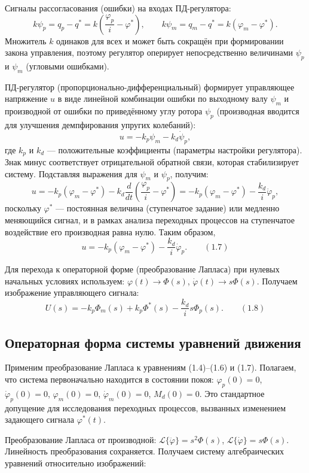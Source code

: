 \documentclass[a4paper, 14pt]{extarticle}
\begin{document}
    Сигналы рассогласования (ошибки) на входах ПД-регулятора:
    \[
    k\psi_p = q_p - q^* = k\left(\frac{\varphi_p}{i} - \varphi^*\right), \qquad
    k\psi_m = q_m - q^* = k\left(\varphi_m - \varphi^*\right).
    \]
    Множитель $k$ одинаков для всех и может быть сокращён при формировании закона управления, поэтому регулятор оперирует непосредственно величинами $\psi_p$ и $\psi_m$ (угловыми ошибками).

    ПД-регулятор (пропорционально-дифференциальный) формирует управляющее напряжение $u$ в виде линейной комбинации ошибки по выходному валу $\psi_m$ и производной от ошибки по приведённому углу ротора $\psi_p$ (производная вводится для улучшения демпфирования упругих колебаний):
    \[
    u = -k_p \psi_m - k_d \dot{\psi}_p,
    \]
    где $k_p$ и $k_d$ — положительные коэффициенты (параметры настройки регулятора). Знак минус соответствует отрицательной обратной связи, которая стабилизирует систему. Подставляя выражения для $\psi_m$ и $\psi_p$, получим:
    \[
    u = -k_p (\varphi_m - \varphi^*) - k_d \frac{d}{dt}\left(\frac{\varphi_p}{i} - \varphi^*\right) = -k_p (\varphi_m - \varphi^*) - \frac{k_d}{i} \dot{\varphi}_p,
    \]
    поскольку $\varphi^*$ — постоянная величина (ступенчатое задание) или медленно меняющийся сигнал, и в рамках анализа переходных процессов на ступенчатое воздействие его производная равна нулю. Таким образом,
    \[
    u = -k_p (\varphi_m - \varphi^*) - \frac{k_d}{i} \dot{\varphi}_p. \qquad (1.7)
    \]

    Для перехода к операторной форме (преобразование Лапласа) при нулевых начальных условиях используем: $\varphi(t) \to \Phi(s)$, $\dot{\varphi}(t) \to s\Phi(s)$. Получаем изображение управляющего сигнала:
    \[
    U(s) = -k_p \Phi_m(s) + k_p \Phi^*(s) - \frac{k_d}{i} s \Phi_p(s). \qquad (1.8)
    \]

    \subsection{Операторная форма системы уравнений движения}
    Применим преобразование Лапласа к уравнениям (1.4)–(1.6) и (1.7). Полагаем, что система первоначально находится в состоянии покоя: $\varphi_p(0)=0$, $\dot{\varphi}_p(0)=0$, $\varphi_m(0)=0$, $\dot{\varphi}_m(0)=0$, $M_d(0)=0$. Это стандартное допущение для исследования переходных процессов, вызванных изменением задающего сигнала $\varphi^*(t)$.

    Преобразование Лапласа от производной: $\mathcal{L}\{\ddot{\varphi}\} = s^2 \Phi(s)$, $\mathcal{L}\{\dot{\varphi}\} = s \Phi(s)$. Линейность преобразования сохраняется. Получаем систему алгебраических уравнений относительно изображений:
\end{document}
